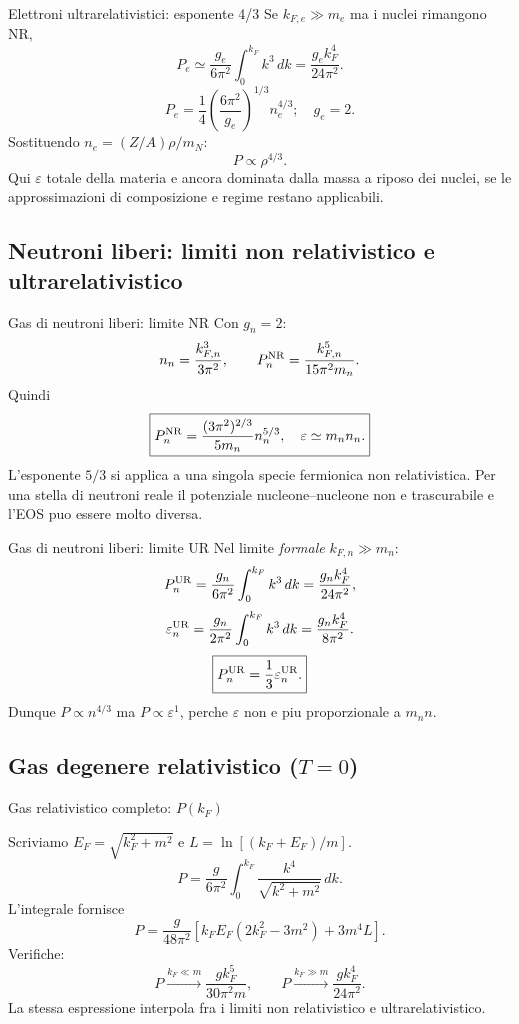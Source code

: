 \begin{frame}[t]{Elettroni ultrarelativistici: esponente 4/3}
\vspace*{3mm}
\small
Se $k_{F,e}\gg m_e$ ma i nuclei rimangono NR,
\[
P_e\simeq\frac{g_e}{6\pi^2}\int_0^{k_F}k^3\,dk
=\frac{g_e k_F^4}{24\pi^2}.
\]
\[
\boxed{P_e=\frac14\left(\frac{6\pi^2}{g_e}\right)^{1/3}n_e^{4/3};\quad g_e=2.}
\]
Sostituendo $n_e=(Z/A)\rho/m_N$:
\[
P\propto\rho^{4/3}.
\]
Qui $\varepsilon$ totale della materia e ancora dominata dalla massa a riposo dei nuclei, se le approssimazioni di composizione e regime restano applicabili.
\end{frame}

\subsection{Neutroni liberi: limiti non relativistico e ultrarelativistico}

\begin{frame}[t]{Gas di neutroni liberi: limite NR}
\vspace*{3mm}
\small
Con $g_n=2$:
\[
n_n=\frac{k_{F,n}^3}{3\pi^2},\qquad
P_n^{\rm NR}=\frac{k_{F,n}^5}{15\pi^2m_n}.
\]
Quindi
\[
\boxed{P_n^{\rm NR}=\frac{(3\pi^2)^{2/3}}{5m_n}n_n^{5/3},\quad
\varepsilon\simeq m_n n_n.}
\]
L'esponente $5/3$ si applica a una singola specie fermionica non relativistica.
Per una stella di neutroni reale il potenziale nucleone--nucleone non e trascurabile e l'EOS puo essere molto diversa.
\end{frame}

\begin{frame}[t]{Gas di neutroni liberi: limite UR}
\vspace*{3mm}
\small
Nel limite \emph{formale} $k_{F,n}\gg m_n$:
\[
P_n^{\rm UR}=\frac{g_n}{6\pi^2}\int_0^{k_F}k^3\,dk
=\frac{g_n k_F^4}{24\pi^2},
\]
\[
\varepsilon_n^{\rm UR}=\frac{g_n}{2\pi^2}\int_0^{k_F}k^3\,dk
=\frac{g_n k_F^4}{8\pi^2}.
\]
\[
\boxed{P_n^{\rm UR}=\frac13\varepsilon_n^{\rm UR}.}
\]
Dunque $P\propto n^{4/3}$ ma $P\propto\varepsilon^1$, perche $\varepsilon$ non e piu proporzionale a $m_n n$.
\end{frame}

\subsection{Gas degenere relativistico ($T=0$)}

\begin{frame}[t]{Gas relativistico completo: $P(k_F)$}
\vspace*{3mm}
\small

Scriviamo $E_F=\sqrt{k_F^2+m^2}$ e $L=\ln[(k_F+E_F)/m]$.
\[
P=\frac{g}{6\pi^2}\int_0^{k_F}\frac{k^4}{\sqrt{k^2+m^2}}\,dk.
\]
L'integrale fornisce
\[
\boxed{P=\frac{g}{48\pi^2}\left[k_FE_F(2k_F^2-3m^2)+3m^4L\right].}
\]
Verifiche:
\[
P\xrightarrow{k_F\ll m}\frac{gk_F^5}{30\pi^2m},\qquad
P\xrightarrow{k_F\gg m}\frac{gk_F^4}{24\pi^2}.
\]
La stessa espressione interpola fra i limiti non relativistico e ultrarelativistico.
\end{frame}

